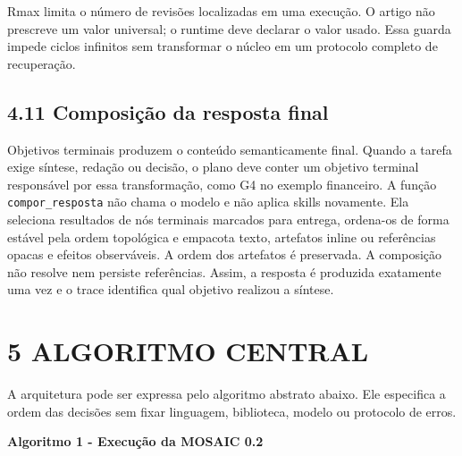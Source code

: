 \documentclass[12pt,a4paper]{article}
\begin{document}
Rmax limita o número de revisões localizadas em uma execução. O artigo não prescreve um valor universal; o runtime deve declarar o valor usado. Essa guarda impede ciclos infinitos sem transformar o núcleo em um protocolo completo de recuperação.


\subsection*{4.11 Composição da resposta final}

Objetivos terminais produzem o conteúdo semanticamente final. Quando a tarefa exige síntese, redação ou decisão, o plano deve conter um objetivo terminal responsável por essa transformação, como G4 no exemplo financeiro. A função\texttt{ compor\_resposta} não chama o modelo e não aplica skills novamente. Ela seleciona resultados de nós terminais marcados para entrega, ordena-os de forma estável pela ordem topológica e empacota texto, artefatos inline ou referências opacas e efeitos observáveis. A ordem dos artefatos é preservada. A composição não resolve nem persiste referências. Assim, a resposta é produzida exatamente uma vez e o trace identifica qual objetivo realizou a síntese.





\section*{5 ALGORITMO CENTRAL}

A arquitetura pode ser expressa pelo algoritmo abstrato abaixo. Ele especifica a ordem das decisões sem fixar linguagem, biblioteca, modelo ou protocolo de erros.


\textbf{Algoritmo 1 - Execução da MOSAIC 0.2}
\end{document}

